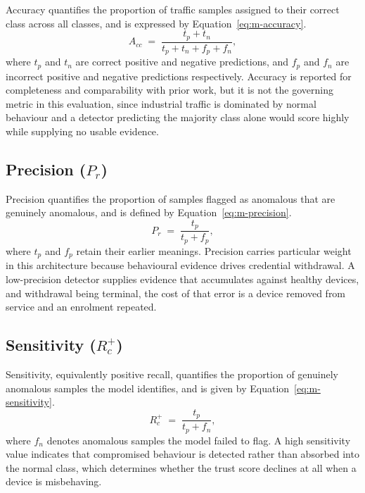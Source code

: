 Accuracy quantifies the proportion of traffic samples assigned to their correct class across all classes, and is expressed by Equation~\eqref{eq:m-accuracy}.
\begin{equation}
\label{eq:m-accuracy}
A_{cc} \;=\; \frac{t_p + t_n}{t_p + t_n + f_p + f_n} ,
\end{equation}
where $t_p$ and $t_n$ are correct positive and negative predictions, and $f_p$ and $f_n$ are incorrect positive and negative predictions respectively. Accuracy is reported for completeness and comparability with prior work, but it is not the governing metric in this evaluation, since industrial traffic is dominated by normal behaviour and a detector predicting the majority class alone would score highly while supplying no usable evidence.

\subsection{Precision ($P_r$)}
\label{sec:metric-precision}

Precision quantifies the proportion of samples flagged as anomalous that are genuinely anomalous, and is defined by Equation~\eqref{eq:m-precision}.
\begin{equation}
\label{eq:m-precision}
P_r \;=\; \frac{t_p}{t_p + f_p} ,
\end{equation}
where $t_p$ and $f_p$ retain their earlier meanings. Precision carries particular weight in this architecture because behavioural evidence drives credential withdrawal. A low-precision detector supplies evidence that accumulates against healthy devices, and withdrawal being terminal, the cost of that error is a device removed from service and an enrolment repeated.

\subsection{Sensitivity ($R_c^{+}$)}
\label{sec:metric-sensitivity}

Sensitivity, equivalently positive recall, quantifies the proportion of genuinely anomalous samples the model identifies, and is given by Equation~\eqref{eq:m-sensitivity}.
\begin{equation}
\label{eq:m-sensitivity}
R_c^{+} \;=\; \frac{t_p}{t_p + f_n} ,
\end{equation}
where $f_n$ denotes anomalous samples the model failed to flag. A high sensitivity value indicates that compromised behaviour is detected rather than absorbed into the normal class, which determines whether the trust score declines at all when a device is misbehaving.


